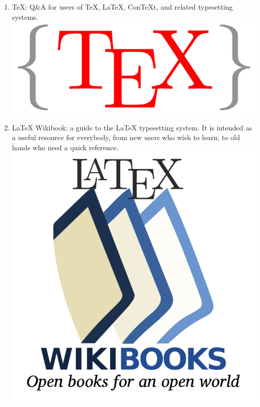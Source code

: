 \documentclass{article} %
\begin{document}
\begin{enumerate}
    \item \TeX{}: Q\&A for users of TeX, LaTeX, ConTeXt, and related typesetting systems. \\
    \vspace{1cm}
         \href{https://tex.stackexchange.com/}{\includegraphics[scale=0.2]{tex.png}}%
         
    \item \LaTeX{} Wikibook: a guide to the LaTeX typesetting system. It is intended as a useful resource for everybody, from new users who wish to learn, to old hands who need a quick reference.\\
    \vspace{1cm}
        \href{https://en.wikibooks.org/wiki/LaTeX}{\includegraphics[scale=0.4]{wikibook.png}}%
        

\end{enumerate}
\end{document}
